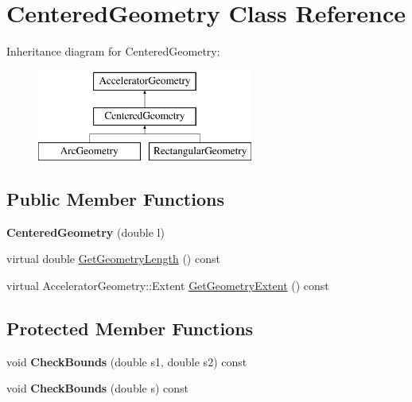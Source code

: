 \hypertarget{classCenteredGeometry}{}\section{Centered\+Geometry Class Reference}
\label{classCenteredGeometry}
Inheritance diagram for Centered\+Geometry\+:\begin{figure}[H]
\begin{center}
\leavevmode
\includegraphics[height=3.000000cm]{classCenteredGeometry}
\end{center}
\end{figure}
\subsection*{Public Member Functions}
\begin{DoxyCompactItemize}
\item 
\mbox{\label{classCenteredGeometry_a3326b5b4b276ef6e7c277ad29d675dbb}} 
{\bfseries Centered\+Geometry} (double l)
\item 
virtual double \hyperlink{classCenteredGeometry_afe03a287567dec16f8663f4211f82add}{Get\+Geometry\+Length} () const
\item 
virtual Accelerator\+Geometry\+::\+Extent \hyperlink{classCenteredGeometry_abd27afe15472ebd057d0b60f1d531a1a}{Get\+Geometry\+Extent} () const
\end{DoxyCompactItemize}
\subsection*{Protected Member Functions}
\begin{DoxyCompactItemize}
\item 
\mbox{\label{classCenteredGeometry_ad3cf5fb2053fa2122b1b2853ad54b88f}} 
void {\bfseries Check\+Bounds} (double s1, double s2) const
\item 
\mbox{\label{classCenteredGeometry_ae17b8865d0b86aa6cc2b391bf3eff7a3}} 
void {\bfseries Check\+Bounds} (double s) const
\end{DoxyCompactItemize}
